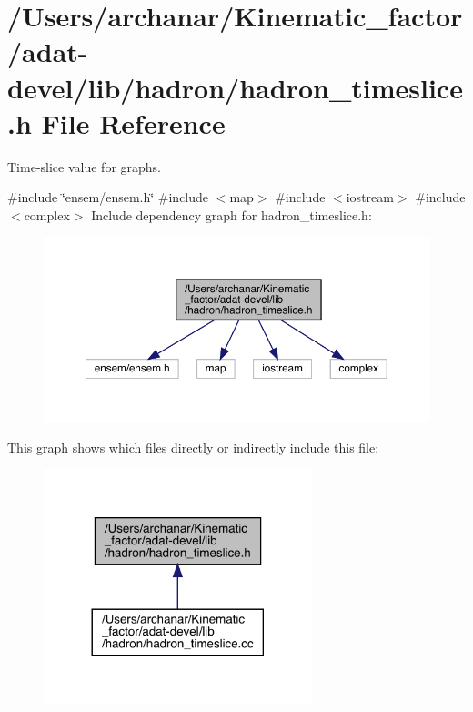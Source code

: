 \hypertarget{adat-devel_2lib_2hadron_2hadron__timeslice_8h}{}\section{/\+Users/archanar/\+Kinematic\+\_\+factor/adat-\/devel/lib/hadron/hadron\+\_\+timeslice.h File Reference}
\label{adat-devel_2lib_2hadron_2hadron__timeslice_8h}


Time-\/slice value for graphs.  


{\ttfamily \#include \char`\"{}ensem/ensem.\+h\char`\"{}}\newline
{\ttfamily \#include $<$map$>$}\newline
{\ttfamily \#include $<$iostream$>$}\newline
{\ttfamily \#include $<$complex$>$}\newline
Include dependency graph for hadron\+\_\+timeslice.\+h\+:
\nopagebreak
\begin{figure}[H]
\begin{center}
\leavevmode
\includegraphics[width=350pt]{d6/dd8/adat-devel_2lib_2hadron_2hadron__timeslice_8h__incl}
\end{center}
\end{figure}
This graph shows which files directly or indirectly include this file\+:
\nopagebreak
\begin{figure}[H]
\begin{center}
\leavevmode
\includegraphics[width=221pt]{d0/d05/adat-devel_2lib_2hadron_2hadron__timeslice_8h__dep__incl}
\end{center}
\end{figure}
